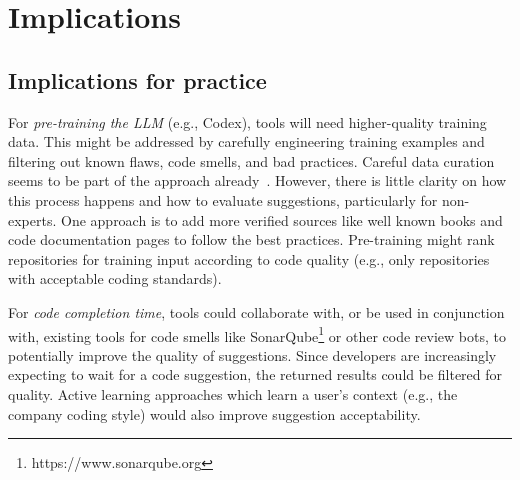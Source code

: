 \section{Implications}
\subsection{Implications for practice}
For \emph{pre-training the LLM} (e.g., Codex), \AISE{} tools will need higher-quality training data. This might be addressed by carefully engineering training examples and filtering out known flaws, code smells, and bad practices. Careful data curation seems to be part of the approach already~\cite{alphacode}. However, there is little clarity on how this process happens and how to evaluate suggestions, particularly for non-experts. One approach is to add more verified sources like well known books and code documentation pages to follow the best practices. 
Pre-training might rank repositories for training input according to code quality (e.g., only repositories with acceptable coding standards). %

For \emph{code completion time}, \AISE{} tools could collaborate with, or be used in conjunction with, existing tools for code smells like SonarQube\footnote{https://www.sonarqube.org} or other code review bots, to potentially improve the quality of suggestions. Since developers are increasingly expecting to wait for a code suggestion, the returned results could be filtered for quality. Active learning approaches which learn a user's context (e.g., the company coding style) would also improve suggestion acceptability. %


